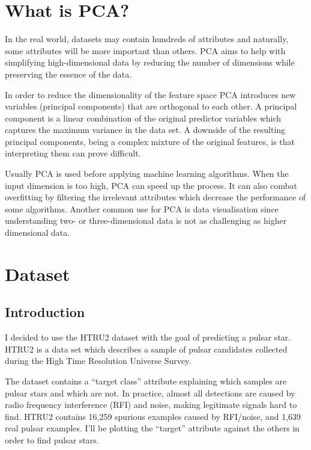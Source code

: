 \documentclass[a4paper,12pt]{article}
\begin{document}
    \section{What is PCA?}
    In the real world, datasets may contain hundreds of attributes and naturally, some attributes will be more important than others. PCA aims to help with simplifying high-dimensional data by reducing the number of dimensions while preserving the essence of the data. \par
    In order to reduce the dimensionality of the feature space PCA introduces new variables (principal components) that are orthogonal to each other. A principal component is a linear combination of the original predictor variables which captures the maximum variance in the data set. A downside of the resulting principal components, being a complex mixture of the original features, is that interpreting them can prove difficult.\par
    Usually PCA is used before applying machine learning algorithms. When the input dimension is too high, PCA can speed up the process. It can also combat overfitting by filtering the irrelevant attributes which decrease the performance of some algorithms. Another common use for PCA is data visualisation since understanding two- or three-dimensional data is not as challenging as higher dimensional data.\par


    \newpage

    \section{Dataset}
    \subsection{Introduction}
    I decided to use the HTRU2 dataset with the goal of predicting a pulsar star. HTRU2 is a data set which describes a sample of pulsar candidates collected during the High Time Resolution Universe Survey.\cite{highTimeResolution}  \par
    The dataset contains a “target class” attribute explaining which samples are pulsar stars and which are not. In practice, almost all detections are caused by radio frequency interference (RFI) and noise, making legitimate signals hard to find. HTRU2 contains 16,259 spurious examples caused by RFI/noise, and 1,639 real pulsar examples. I’ll be plotting the “target” attribute against the others in order to find pulsar stars.\cite{htru2}
\end{document}

